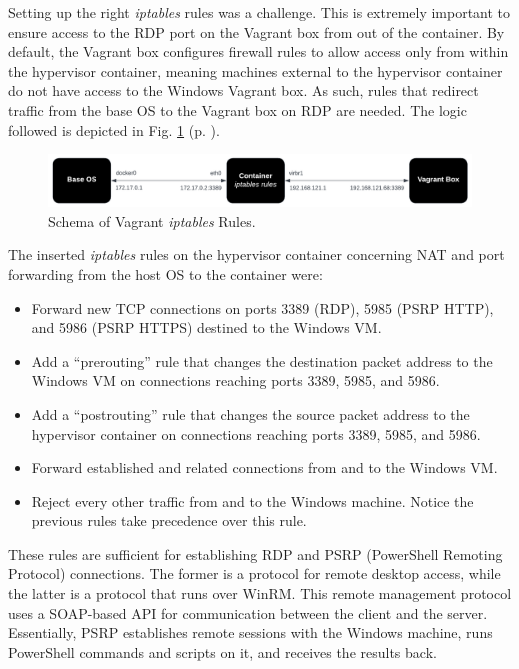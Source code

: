 Setting up the right \textit{iptables} rules was a challenge. This is extremely important to ensure access to the RDP port on the Vagrant box from out of the container. By default, the Vagrant box configures firewall rules to allow access only from within the hypervisor container, meaning machines external to the hypervisor container do not have access to the Windows Vagrant box. As such, rules that redirect traffic from the base OS to the Vagrant box on RDP are needed. The logic followed is depicted in Fig. \ref{fig:vagrant_iptables_rules} (p. \pageref{fig:vagrant_iptables_rules}).

\begin{figure}[H]
    \includegraphics[width=13cm]{figures/vagrant_iptables_rules.pdf}
    \caption{Schema of Vagrant \textit{iptables} Rules.}
    \label{fig:vagrant_iptables_rules}
\end{figure}

The inserted \textit{iptables} rules on the hypervisor container concerning NAT and port forwarding from the host OS to the container were:

\begin{itemize}
    \item Forward new TCP connections on ports 3389 (RDP), 5985 (PSRP HTTP), and 5986 (PSRP HTTPS) destined to the Windows VM.
    \item Add a ``prerouting'' rule that changes the destination packet address to the Windows VM on connections reaching ports 3389, 5985, and 5986.
    \item Add a ``postrouting'' rule that changes the source packet address to the hypervisor container on connections reaching ports 3389, 5985, and 5986.
    \item Forward established and related connections from and to the Windows VM.
    \item Reject every other traffic from and to the Windows machine. Notice the previous rules take precedence over this rule.
\end{itemize}

These rules are sufficient for establishing RDP and PSRP (PowerShell Remoting Protocol) connections. The former is a protocol for remote desktop access, while the latter is a protocol that runs over WinRM. This remote management protocol uses a SOAP-based API for communication between the client and the server. Essentially, PSRP establishes remote sessions with the Windows machine, runs PowerShell commands and scripts on it, and receives the results back.

